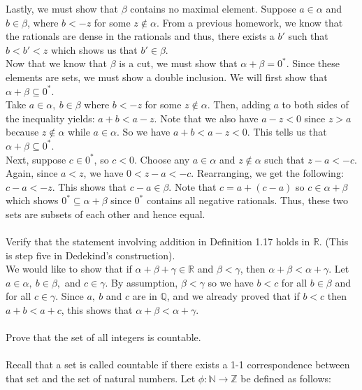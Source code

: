 \documentclass[12pt]{article}
\begin{document}
Lastly, we must show that $\beta$ contains no maximal element. Suppose $a \in \alpha$ and $b \in \beta$, where $b<-z$ for some $z \notin \alpha.$ From a previous homework, we know that the rationals are dense in the rationals and thus, there exists a $b'$ such that $b<b'<z$ which shows us that $b' \in \beta$. \\ 

Now that we know that $\beta$ is a cut, we must show that $\alpha + \beta = 0^{*}$. Since these elements are sets, we must show a double inclusion. We will first show that $\alpha + \beta \subseteq 0^{*}$. \\ 

Take $a \in \alpha,~ b \in \beta$ where $b<-z$ for some $z \notin \alpha$. Then, adding $a$ to both sides of the inequality yields: $a+b<a-z$. Note that we also have $a-z<0$ since $z>a$ because $z \notin \alpha$ while $a \in \alpha$. So we have $a+b<a-z<0$. This tells us that $\alpha + \beta \subseteq 0^{*}$. \\
\indent Next, suppose $c \in 0^{*}$, so $c<0$. Choose any $a \in \alpha$ and $z \notin \alpha$ such that $z-a<-c$. Again, since $a<z$, we have $0<z-a<-c$. Rearranging, we get the following: $c-a<-z$. This shows that $c-a \in \beta$. Note that $c=a+(c-a)$ so $c \in \alpha + \beta$ which shows $0^{*} \subseteq \alpha + \beta$ since $0^{*}$ contains all negative rationals. Thus, these two sets are subsets of each other and hence equal. \\ \\

\problem Verify that the statement involving addition in Definition 1.17 holds in $\mathbb{R}$. (This is step five in Dedekind's construction). \\

We would like to show that if $\alpha + \beta + \gamma \in \mathbb{R}$ and $\beta < \gamma$, then $\alpha + \beta < \alpha + \gamma$. Let $a \in \alpha,~b \in \beta,$ and $c \in \gamma.$  By assumption, $\beta< \gamma$ so we have $b<c$ for all $b \in \beta$ and for all $c \in \gamma$. Since $a,~b$ and $c$ are in $\mathbb{Q}$, and we already proved that if $b<c$ then $a+b<a+c$, this shows that $\alpha + \beta < \alpha + \gamma$. \\ \\


\problem Prove that the set of all integers is countable. \\ \\ 

Recall that a set is called countable if there exists a 1-1 correspondence between that set and the set of natural numbers. Let  $\phi: \mathbb{N} \rightarrow \mathbb{Z}$ be defined as follows: 
\end{document}
